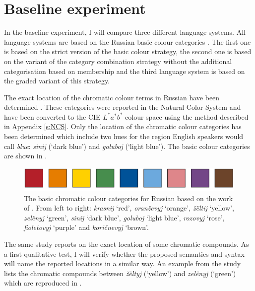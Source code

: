 \section{Baseline experiment}

In the baseline experiment, I will compare three different language
systems. All language systems are based on the Russian basic colour
categories \citep{safuanova07russian}. The first one is based on the
strict version of the basic colour strategy, the second one is
based on the variant of the category combination strategy
without the additional categorisation based on membership and the
third language system is based on the graded variant of this strategy.

The exact location of the chromatic colour terms in Russian have been
determined \citep{safuanova07russian}. These categories were reported
in the Natural Color System and have been converted to the CIE
$L^*a^*b^*$ colour space using the method described in Appendix
\ref{s:NCS}. Only the location of the chromatic colour categories has
been determined which include two hues for the region English speakers
would call \textit{blue}: \textit{sinij} (`dark blue') and \textit{goluboj} (`light
blue'). The basic colour categories are shown in .

\begin{figure}[htpb]
  \centering
  \includegraphics[height=1.25cm]{./category-combination/figures/russian-basic-categories.pdf}
  \caption[The basic chromatic colour categories for Russian]{The
    basic chromatic colour categories for Russian based on the work of
    \citeauthor{safuanova07russian}. From left to right: \textit{krasnij}
    `red', \textit{oran\v zevyj} `orange', \textit{\v z\"eltij} `yellow', \textit{zel\"enyj}
    `green', \textit{sinij} `dark blue', \textit{goluboj} `light blue',
    \textit{rozovyj} `rose', \textit{fioletovyj} `purple' and \textit{kori\v cnevyj}
    `brown'.}
  \label{f:ccs-russian-basic}
\end{figure}

The same study reports on the exact location of some chromatic
compounds. As a first qualitative test, I will verify whether the
proposed semantics and syntax will name the reported locations in a
similar way. An example from the study lists the chromatic compounds
between \textit{\v z\"eltyj} (`yellow') and \textit{zel\"enyj} (`green') which are
reproduced in .

